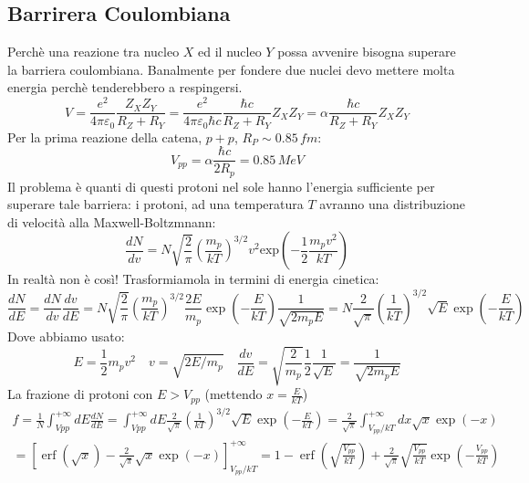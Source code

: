 \subsection{Barrirera Coulombiana}
Perchè una reazione tra nucleo $X$ ed il nucleo $Y$ possa avvenire bisogna superare la barriera coulombiana. Banalmente per fondere due nuclei devo mettere molta energia perchè tenderebbero a respingersi.
\begin{equation*}
    V=\frac{e^2}{4\pi\varepsilon_0}\frac{Z_XZ_Y}{R_Z+R_Y}=\frac{e^2}{4\pi\varepsilon_0\hbar c}\frac{\hbar c}{R_Z+R_Y}Z_XZ_Y=\alpha\frac{\hbar c}{R_Z+R_Y}Z_XZ_Y
\end{equation*}
Per la prima reazione della catena, $p+p$, $R_P\sim0.85\,fm$:
\begin{equation*}
    V_{pp}=\alpha\frac{\hbar c}{2R_p}=0.85\,MeV
\end{equation*}
Il problema è quanti di questi protoni nel sole hanno l'energia sufficiente per superare tale barriera: i protoni, ad una temperatura $T$ avranno una distribuzione di velocità alla Maxwell-Boltzmnann:
\begin{equation*}
    \frac{dN}{dv}=N\sqrt{\frac{2}{\pi}}\left(\frac{m_p}{kT}\right)^{3/2}v^2\text{exp}\left(-\frac{1}{2}\frac{m_pv^2}{kT}\right)
\end{equation*} 
In realtà non è così! Trasformiamola in termini di energia cinetica:
\begin{equation*}
     \frac{d N}{d E}=\frac{d N}{d v} \frac{d v}{d E}=N \sqrt{\frac{2}{\pi}}\left(\frac{m_p}{k T}\right)^{3 / 2} \frac{2 E}{m_p} \exp \left(-\frac{E}{k T}\right) \frac{1}{\sqrt{2 m_p E}}=N \frac{2}{\sqrt{\pi}}\left(\frac{1}{k T}\right)^{3 / 2} \sqrt{E} \exp \left(-\frac{E}{k T}\right)
\end{equation*}
Dove abbiamo usato:
\begin{equation*}
   E=\frac{1}{2} m_p v^2 \quad v=\sqrt{2 E / m_p} \quad \frac{d v}{d E}=\sqrt{\frac{2}{m_p}} \frac{1}{2} \frac{1}{\sqrt{E}}=\frac{1}{\sqrt{2 m_p E}}
\end{equation*}
La frazione di protoni con $E>V_{pp}$ (mettendo $x=\frac{E}{k T}$)
\begin{align*}
f  =\frac{1}{N} \int_{V p p}^{+\infty} d E \frac{d N}{d E}=\int_{V p p}^{+\infty} d E \frac{2}{\sqrt{\pi}}\left(\frac{1}{k T}\right)^{3 / 2} \sqrt{E} \exp \left(-\frac{E}{k T}\right)=\frac{2}{\sqrt{\pi}} \int_{V_{p p} / k T}^{+\infty} d x \sqrt{x} \exp (-x) \quad \\  =\left[\operatorname{erf}(\sqrt{x})-\frac{2}{\sqrt{\pi}} \sqrt{x} \exp (-x)\right]_{V_{p p} / k T}^{+\infty}=1-\operatorname{erf}\left(\sqrt{\frac{V_{p p}}{k T}}\right)+\frac{2}{\sqrt{\pi}} \sqrt{\frac{V_{p p}}{k T}} \exp \left(-\frac{V_{p p}}{k T}\right) 
\end{align*}
